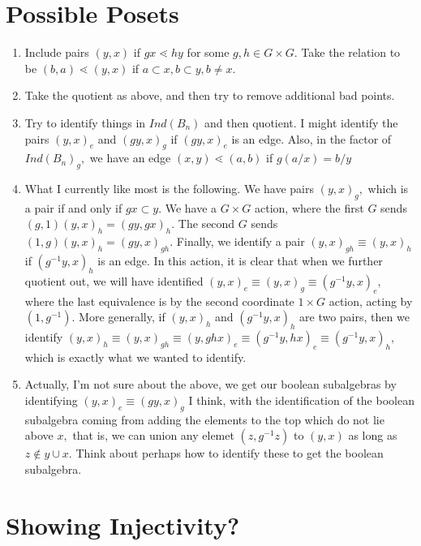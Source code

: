 \documentclass{amsart}
\begin{document}
\section{Possible Posets}

\begin{enumerate}
	\item Include pairs $(y,x)$ if $gx \lessdot hy$ for some $g,h \in G\times G.$ Take the relation to be $(b,a) \lessdot (y,x)$ if $a \subset x, b \subset y, b \neq x.$
	\item Take the quotient as above, and then try to remove additional bad points.
	\item Try to identify things in $Ind(B_n)$ and then quotient. I might identify the pairs $(y,x)_e$ and $(gy,x)_g$ if $(gy,x)_e$ is an edge. Also, in the factor of $Ind(B_n)_g,$ we have an edge $(x,y)\lessdot(a,b)$ if $g(a / x) = b/y $ 
	\item What I currently like most is the following. We have pairs $(y,x)_g,$ which is a pair if and only if $gx \subset y.$ We have a $G\times G$ action, where the first $G$ sends $(g,1)(y,x)_h = (gy,gx)_h.$ The second $G$ sends $(1,g)(y,x)_h = (gy,x)_{gh}.$ Finally, we identify a pair $(y,x)_{gh} \equiv (y,x)_h$ if $(g^{-1}y,x)_h$ is an edge. In this action, it is clear that when we further quotient out, we will have identified $(y,x)_e \equiv (y,x)_g \equiv (g^{-1}y,x)_e,$ where the last equivalence is by the second coordinate $1 \times G$ action, acting by $(1,g^{-1}).$ More generally, if $(y,x)_h$ and $(g^{-1}y,x)_h$ are two pairs, then we identify $(y,x)_h \equiv (y,x)_{gh} \equiv (y,ghx)_e \equiv (g^{-1}y,hx)_e \equiv (g^{-1}y,x)_h,$ which is exactly what we wanted to identify.
	
	\item Actually, I'm not sure about the above, we get our boolean subalgebras by identifying $(y,x)_e \equiv (gy,x)_g$ I think, with the identification of the boolean subalgebra coming from adding the elements to the top which do not lie above $x,$ that is, we can union any elemet $(z,g^{-1}z)$ to $(y,x)$ as long as $z\notin y \cup x.$ Think about perhaps how to identify these to get the boolean subalgebra.
\end{enumerate}

\section{Showing Injectivity?}
\end{document}
